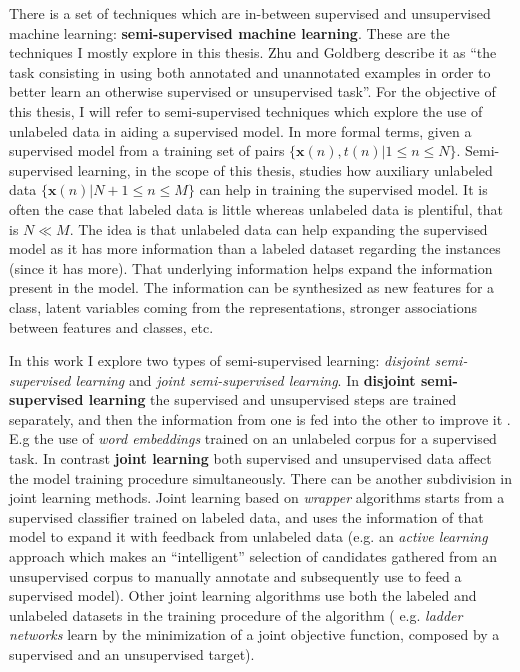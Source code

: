 There is a set of techniques which are in-between supervised and unsupervised
machine learning: {\bf semi-supervised machine learning}. These are the
techniques I mostly explore in this thesis. Zhu and Goldberg
\cite{zhu2009introduction} describe it as ``the task consisting in using both
annotated and unannotated examples in order to better learn an otherwise
supervised or unsupervised task''. For the objective of this thesis, I will
refer to semi-supervised techniques which explore the use of unlabeled data in
aiding a supervised model. In more formal terms, given a supervised model from
a training set of pairs $\{\textbf{x}(n), t(n) | 1 \leq n \leq N\}$.
Semi-supervised learning, in the scope of this thesis, studies how auxiliary
unlabeled data $\{\textbf{x}(n) | N + 1 \leq n \leq M\}$ can help in training
the supervised model. It is often the case that labeled data is little whereas
unlabeled data is plentiful, that is $N \ll M$. The idea is that unlabeled data
can help expanding the supervised model as it has more information than a
labeled dataset regarding the instances (since it has more). That underlying
information helps expand the information present in the model. The information
can be synthesized as new features for a class, latent variables coming from
the representations, stronger associations between features and classes, etc.

In this work I explore two types of semi-supervised learning: {\em disjoint
semi-supervised learning} and {\em joint semi-supervised learning}. In {\bf
disjoint semi-supervised learning} the supervised and unsupervised steps are
trained separately, and then the information from one is fed into the other to
improve it \cite{Weston2008}. E.g the use of {\em word embeddings} trained on
an unlabeled corpus for a supervised task. In contrast {\bf joint learning}
both supervised and unsupervised data affect the model training procedure
simultaneously. There can be another subdivision in joint learning methods.
Joint learning based on {\em wrapper} algorithms starts from a supervised
classifier trained on labeled data, and uses the information of that model to
expand it with feedback from unlabeled data (e.g. an {\em active learning}
approach which makes an ``intelligent'' selection of candidates gathered from
an unsupervised corpus to manually annotate and subsequently use to feed a
supervised model). Other joint learning algorithms use both the labeled and
unlabeled datasets in the training procedure of the algorithm ( e.g. {\em
ladder networks} learn by the minimization of a joint objective function,
composed by a supervised and an unsupervised target).

